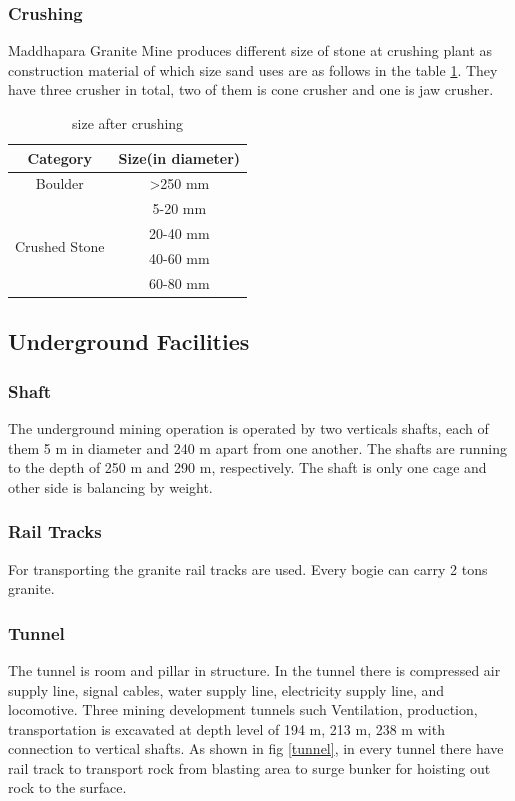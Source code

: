\documentclass[12pt,a4paper]{article}
\begin{document}
\subsubsection{Crushing}
Maddhapara Granite Mine produces different size of stone at crushing plant as construction material of which size sand uses are as follows in the table \ref{sizeaftercrushing}. They have three crusher in total, two of them is cone crusher and one is jaw crusher.
\vspace{20pt}
\begin{table}[t]
\caption{size after crushing}
\vspace{5pt}
\centering
\label{sizeaftercrushing}
\begin{tabular}{|c|c|}
\hline
Category                       & Size(in diameter)   \\ \hline
Boulder                        & \textgreater{}250 mm \\ \hline
\multirow{4}{*}{Crushed Stone} & 5-20 mm              \\ \cline{2-2} 
                               & 20-40 mm             \\ \cline{2-2} 
                               & 40-60 mm             \\ \cline{2-2} 
                               & 60-80 mm             \\ \hline
\end{tabular}
\end{table}

\subsection{Underground Facilities}
\subsubsection{Shaft}
The underground mining operation is operated by two verticals shafts, each of them 5 m in diameter and 240 m apart from one another. The shafts are running to the depth of 250 m and 290 m, respectively. The shaft is only one cage and other side is balancing by weight.

\subsubsection{Rail Tracks}
For transporting the granite rail tracks are used. Every bogie can carry 2 tons granite.

\subsubsection{Tunnel}
The tunnel is room and pillar in structure. In the tunnel there is compressed air supply line, signal cables, water supply line, electricity supply line, and locomotive. Three mining development tunnels such Ventilation, production, transportation is excavated at depth level of 194 m, 213 m, 238 m with connection to vertical shafts. As shown in fig \ref{tunnel}, in every tunnel there have rail track to transport rock from blasting area to surge bunker for hoisting out rock to the surface.
\end{document}
